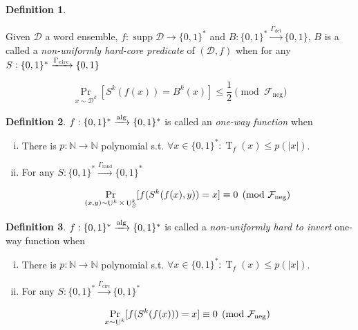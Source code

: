 \documentclass[11pt]{article}
\numberwithin{equation}{section}
\theoremstyle{definition}
\newtheorem{definition}{Definition}[section]
\theoremstyle{plain}
\newcommand{\Bool}{\{0,1\}}
\newcommand{\Words}{{\Bool^*}}
\DeclareMathOperator{\Supp}{supp}
\DeclareMathOperator{\Prb}{Pr}
\DeclareMathOperator{\T}{T}
\DeclareMathOperator{\Un}{U}
\newcommand{\Nats}{\mathbb{N}}
\newcommand{\Abs}[1]{\lvert #1 \rvert}
\newcommand{\Dist}{\mathcal{D}}
\newcommand{\Fall}{\mathcal{F}}
\newcommand{\Alg}{\xrightarrow{\textnormal{alg}}}
\begin{document}
\begin{samepage}
\begin{definition}
\label{def:hard_core_adv}

Given $\Dist$ a word ensemble, $f: \Supp \Dist \rightarrow \Words$ and ${B: \Words \xrightarrow{\Gamma_{\text{det}}} \Bool}$, $B$ is a called a \emph{non-uniformly hard-core predicate} of $(\Dist,f)$ when for any ${S: \Words \xrightarrow{\Gamma_{\textnormal{circ}}} \Bool}$ 

\begin{equation}
\Prb_{x \sim \Dist^k}[S^k(f(x))=B^k(x)] \leq \frac{1}{2} \pmod {\Fall_{\text{neg}}}
\end{equation}

\end{definition}
\end{samepage}

\begin{samepage}
\begin{definition}

$f: \Words \Alg \Words$ is called an \emph{one-way function}
when

\begin{enumerate}[(i)]

\item There is $p: \Nats \rightarrow \Nats$ polynomial s.t. $\forall x \in \Words: \T_f(x) \leq p(\Abs{x})$.

\item For any $S: \Words \xrightarrow{\Gamma_{\text{rand}}} \Words$

\begin{equation}
\Prb_{(x,y) \sim \Un^k \times \Un_S^k}[f(S^k(f(x),y))=x] \equiv 0 \pmod {\Fall_{\textnormal{neg}}}
\end{equation}

\end{enumerate}

\end{definition}
\end{samepage}

\begin{samepage}
\begin{definition}

$f: \Words \Alg \Words$ is called a \emph{non-uniformly hard to invert} one-way function
when

\begin{enumerate}[(i)]

\item There is $p: \Nats \rightarrow \Nats$ polynomial s.t. $\forall x \in \Words: \T_f(x) \leq p(\Abs{x})$.

\item For any $S: \Words \xrightarrow{\Gamma_{\text{circ}}} \Words$

\begin{equation}
\Prb_{x \sim \Un^k}[f(S^k(f(x)))=x] \equiv 0 \pmod {\Fall_{\textnormal{neg}}}
\end{equation}

\end{enumerate}

\end{definition}
\end{samepage}
\end{document}
